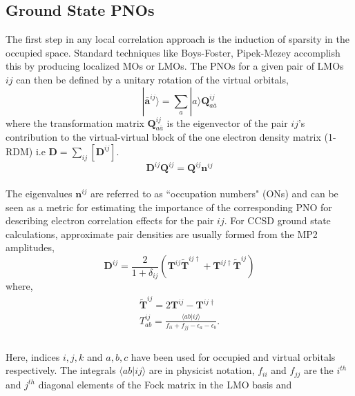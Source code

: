 \subsection{Ground State PNOs}
The first step in any local correlation approach is the induction of sparsity in the
occupied space. Standard techniques like Boys-Foster, Pipek-Mezey\cite{BoughtonPulay93} accomplish this by 
producing localized MOs or LMOs. The PNOs for a given pair of LMOs $ij$ can then be 
defined by a unitary rotation of the virtual orbitals,
\\
\begin{equation}
|\bm{\bar{a}}^{ij}\rangle = \sum_a |a\rangle \bm{Q}^{ij}_{a\bar{a}}
\end{equation}
where the transformation matrix $\bm{Q}^{ij}_{a\bar{a}}$ is the eigenvector
of the pair $ij$'s contribution to the virtual-virtual block of the one
electron density matrix (1-RDM) i.e $\bm{D} = \sum\limits_{ij}[\bm{D}^{ij}]$.
\\
\begin{equation}
\bm{D}^{ij} \bm{Q}^{ij} = \bm{Q}^{ij} \bm{n}^{ij}
\end{equation} 
\\
The eigenvalues $\bm{n}^{ij}$ are referred to as ``occupation numbers" (ONs) and 
can be seen as a metric for estimating the importance of the corresponding PNO
for describing electron correlation effects for the pair $ij$. For CCSD 
ground state calculations, approximate pair densities are usually formed from 
the MP2 amplitudes,
\\
\begin{equation}
\bm{D}^{ij} = \frac{2}{1+\delta_{ij}} (\bm{T}^{ij}\tilde{\bm{T}}^{ij\dagger} + \bm{T}^{ij\dagger}\tilde{\bm{T}}^{ij})
\end{equation}
where, 
\begin{equation}
\begin{split}
\tilde{\bm{T}}^{ij} = 2\bm{T}^{ij} - \bm{T}^{ij\dagger} \\
T^{ij}_{ab} = \frac{\langle ab|ij \rangle}{f_{ii} + f_{jj} - \epsilon_a - \epsilon_b}.\\
\end{split}
\end{equation} 
\\
Here, indices $i,j,k$ and $a,b,c$ have been used for occupied and virtual orbitals respectively. The 
integrals $\langle ab|ij \rangle$ are in physicist notation, $f_{ii}$ and $f_{jj}$ are the
$i^{th}$ and $j^{th}$ diagonal elements of the Fock matrix in the LMO basis and 
